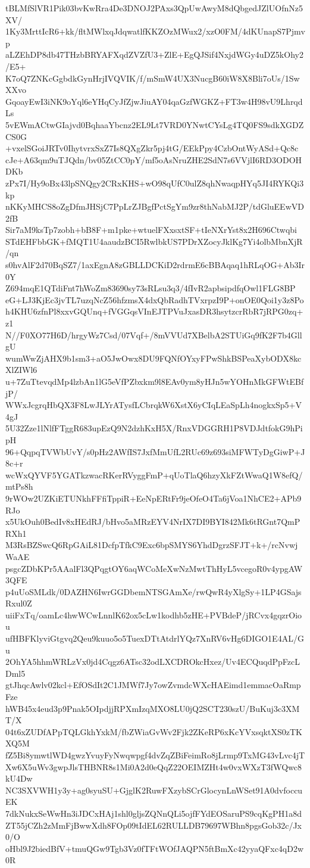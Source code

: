 tBLMfSlVR1Pik03bvKwRra4De3DNOJ2PAxs3QpUwAwyM8dQbgedJZlUOfnNz5XV/
1Ky3MrttIcR6+kk/fltMWlxqJdqwatlfKKZOzMWux2/xzO0FM/4dKUnapS7Pjmvp
aLZEhDP8db47THzbBRYAFXqdZVZfU3+ZlE+EgQJSif4NxjdWGy4uDZ5kOhy2/E5+
K7oQ7ZNKcGgbdkGynHrjIVQVIK/f/mSmW4UX3NucgB60iW8X8Bli7oUs/1SwXXvo
GqoayEwI3iNK9oYql6eYHqCyJfZjwJiuAY04qaGzfWGKZ+FT3w4H98vU9LhrqdLs
5vEWmACtwGIajvd0BqhaaYbcnz2EL9Lt7VRD0YNwtCYsLg4TQ0FS9sdkXGDZCS0G
+vxelSGoiJRTv0IhytvrxSxZ7Is8QXgZkr5pj4tG/EEkPpy4CzbOntWyASd+Qc8c
cJe+A63qm9uTJQdn/bv05ZtCC0pY/mf5oAsNruZHE2SdN7s6VVjlI6RD3ODOHDKb
zPx7I/Hy9oBx43lpSNQgy2CRxKHS+wO98qUfC0ulZ8qhNwaqpHYq5JI4RYKQi3kp
nKKyMHCS8oZgDfmJHSjC7PpLrZJBgfPctSgYm9zr8thNabMJ2P/tdGluEEwVD2fB
Sir7aM9ksTp7zobh+bB8F+m1pke+wtuelFXxsxtSF+tIeNXrYst8x2H696Ctwqbi
STdEHFbbGK+fMQT1U4aaudzBCI5RwlbkUS7PDrXZocyJklKg7Yi4olbMbnXjR/qn
s0hvAlF2d70BqSZ7/1axEgnA8zGBLLDCKiD2rdrmE6cBBAqaq1hRLqOG+Ab3Ir0Y
Z694mqE1QTdiFnt7hWoZm83690sy73sRLsu3q3/4fIvR2apbsipdfqOwl1FLG8BP
eG+LJ3KjEc3jvTL7uzqNcZ56hfzmsX4dxQbRadhTVxrpzI9P+onOE0Qoi1y3z8Po
h4KHU6zfnPl8xxvGQUnq+fVGGqsVInEJTPVuJxasDR3hsytzcrRbR7jRPG0zq+z1
N//F0XO77H6D/hrgyWz7Csd/07Vqf+/8mVVUd7XBelbA2STUiGq9fK2F7b4GllgU
wumWwZjAHX9b1sm3+aO5JwOwx8DU9FQNfOYxyFPwShkBSPeaXybODX8kcXlZIWl6
u+7ZuTtevqdMp4lzbAn1lG5eVfPZbxkm9l8EAv0ym8yHJn5wYOHnMkGFWtEBfjP/
WWxJcgrqHbQX3F8LwJLYrATysfLCbrqkW6XstX6yCIqLEaSpLh4nogkxSp5+V4gJ
5U32Zze1lNlfFTggR683upEzQ9N2dzhKxH5X/RnxVDGGRH1P8VDJdtfokG9hPipH
96+QqpqTVWbUvY/s0pHz2AWfIS7JxfMmUfL2RUc69z693siMFWTyDgGiwP+J8c+r
wcWxQYVF5YGATkzwacRKerRVyggFmP+qUoTlaQ6hzyXkFZtWwaQ1W8efQ/mtPs8h
9rWOw2UZKiETUNkhFFfiTppiR+EeNpERtFr9jeOfeO4Ta6jVoa1NhCE2+APb9RJo
x5UkOuh0BedIv8xHEdRJ/bHvo5aMRzEYV4NrIX7DI9BYI842Mk6tRGnt7QmPRXh1
M3RsBZSwcQ6RpGAiL81DcfpTfkC9Exc6bpSMYS6YhdDgrzSFJT+k+/rcNvwjWaAE
psgcZDbKPr5AAalFl3QPqgtOY6aqWCoMeXwNzMwtThHyL5vcegoR0v4ypgAW3QFE
p4uUoSMLdk/0DAZHN6IwrGGDbemNTSGAmXe/rwQwR4yXlgSy+1LP4GSajsRxul0Z
uiiFxTq/oamLc4hwWCwLnnlK62ox5cLw1kodhb5zHE+PVBdeP/jRCvx4gqzrOiou
ufHBFKlyviGtgvq2Qeu9kuuo5o5TuexDTtAtdrlYQz7XnRV6vHg6DIGO1E4AL/Gu
2OhYA5hhmWRLzVx0jd4Cqgz6ATsc32odLXCDROkcHxez/Uv4ECQuqdPpFzcLDml5
gtJhqcAwlv02kcl+EfOSdIt2C1JMWf7Jy7owZvmdcWXcHAEimd1emmacOaRmpFze
hWB45x4eud3p9Pnak5OIpdjjRPXmIzqMXO8LU0jQ2SCT230szU/BuKuj3c3XMT/X
04t6xZUDfAPpTQLGkhYxkM/fbZWiaGvWv2Fjk2ZKeRP6xKcYVxsqktXS0zTKXQ5M
fZ5Bi8ymwtlWD4gwzYvuyFyNwqwpgf4dvZqZBiFeimRo8jLrmp9TxMG43vLvc4jT
Xw6X5uWv3gwpJlsTHBNR8s1Mi0A2d0eQqZ22OEIMZHt4w0vxWXzT3fWQwc8kU4Dw
NC3SXVWH1y3y+ag0syuSU+GjglK2RuwFXzybSCrGlocynLnWSet91A0dvfoccuEK
7dkNukxSeWwHn3iJDCxHAj1shl0gljsZQNnQLi5ojfFYdEOSaruPS9cqKgPH1a8d
ZT55jCZh2zMmFjBwwXdh8FOp09tIdEL62RULLDB79697WBhn8pgsGob32c/Jx0/O
oHbl9J2biedBfV+tmuQGw9Tgb3Vz0fTFtWOfJAQPN5ftBmXc42yyaQFxc4qD2w0R
